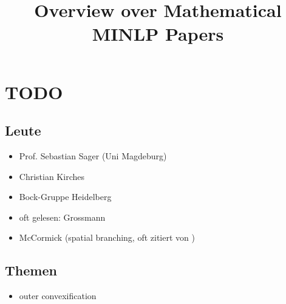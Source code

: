 \documentclass{article}
\title{\textbf{Overview over Mathematical MINLP Papers}}
\date{}
\begin{document}
\maketitle
\tableofcontents

\newpage

\section{TODO}
\subsection{Leute}
\begin{itemize}
\item Prof. Sebastian Sager (Uni Magdeburg)
\item Christian Kirches
\item Bock-Gruppe Heidelberg
\item oft gelesen: Grossmann
\item McCormick (spatial branching, oft zitiert von \cite{burer2012non})
\end{itemize}
\subsection{Themen}
\begin{itemize}
\item outer convexification
\end{itemize}
\end{document}

